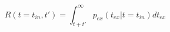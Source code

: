 \begin{equation}
R(t=t_{in},t') = \int_{t+t'}^\infty p_{ex}(t_{ex}|t=t_{in}) dt_{ex}  
\end{equation}